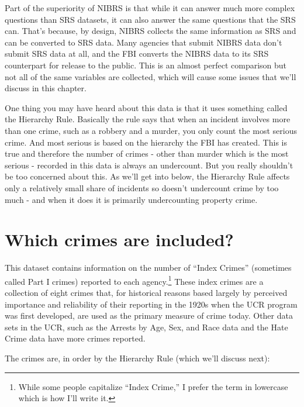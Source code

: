 \documentclass[
  12pt,
  openany]{book}
\begin{document}
Part of the superiority of NIBRS is that while it can answer much more complex questions than SRS datasets, it can also answer the same questions that the SRS can. That's because, by design, NIBRS collects the same information as SRS and can be converted to SRS data. Many agencies that submit NIBRS data don't submit SRS data at all, and the FBI converts the NIBRS data to its SRS counterpart for release to the public. This is an almost perfect comparison but not all of the same variables are collected, which will cause some issues that we'll discuss in this chapter.

One thing you may have heard about this data is that it uses something called the Hierarchy Rule. Basically the rule says that when an incident involves more than one crime, such as a robbery and a murder, you only count the most serious crime. And most serious is based on the hierarchy the FBI has created. This is true and therefore the number of crimes - other than murder which is the most serious - recorded in this data is always an undercount. But you really shouldn't be too concerned about this. As we'll get into below, the Hierarchy Rule affects only a relatively small share of incidents so doesn't undercount crime by too much - and when it does it is primarily undercounting property crime.

\section{Which crimes are included?}\label{indexCrimesOffensesKnown}

This dataset contains information on the number of ``Index Crimes'' (sometimes called Part I crimes) reported to each agency.\footnote{While some people capitalize ``Index Crime,'' I prefer the term in lowercase which is how I'll write it.} These index crimes are a collection of eight crimes that, for historical reasons based largely by perceived importance and reliability of their reporting in the 1920s when the UCR program was first developed, are used as the primary measure of crime today. Other data sets in the UCR, such as the Arrests by Age, Sex, and Race data and the Hate Crime data have more crimes reported.

The crimes are, in order by the Hierarchy Rule (which we'll discuss next):
\end{document}

